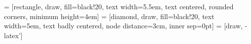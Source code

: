 % 
%

 = [rectangle, draw, fill=black!20, text width=5.5em, text centered, rounded corners, minimum height=4em]
 = [diamond, draw, fill=black!20, text width=5em, text badly centered, node distance=3cm, inner sep=0pt]
 = [draw, -latex']